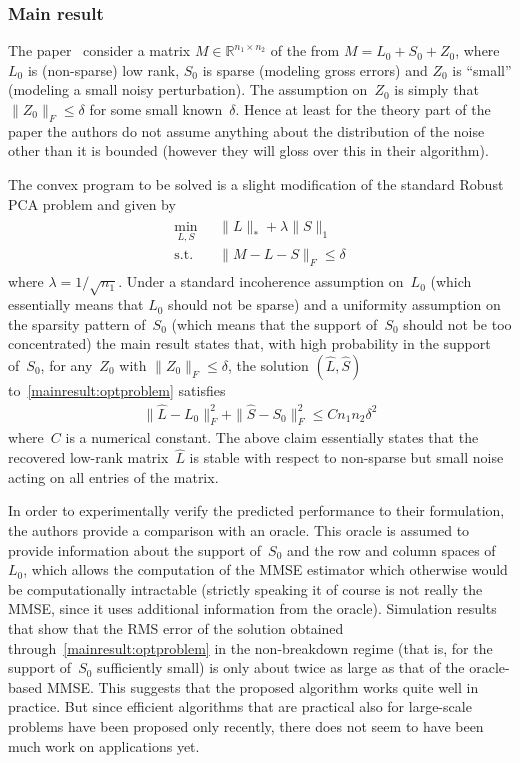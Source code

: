 \subsubsection{Main result}

The paper~\cite{Zhou:2010vn} consider a matrix $M\in\mathbb{R}^{n_1\times n_2}$ of the from $M = L_0+S_0+Z_0$, where~$L_0$ is (non-sparse) low rank, $S_0$ is sparse (modeling gross errors) and $Z_0$ is ``small'' (modeling a small noisy perturbation). The assumption on~$Z_0$ is simply that $\|Z_0\|_F \leq \delta$ for some small known~$\delta$. Hence at least for the theory part of the paper the authors do not assume anything about the distribution of the noise other than it is bounded (however they will gloss over this in their algorithm).

The convex program to be solved is a slight modification of the standard Robust PCA problem and given by
\begin{align}
\begin{split}
\min_{L,S} \; &\|L\|_* + \lambda \|S\|_1 \\
\text{s.t.} \quad &\|M-L-S\|_F \leq \delta
\end{split}
\label{mainresult:optproblem}
\end{align}
where $\lambda = 1/\sqrt{n_1}$. Under a standard incoherence assumption on~$L_0$ (which essentially means that $L_0$ should not be sparse) and a uniformity assumption on the sparsity pattern of~$S_0$ (which means that the support of~$S_0$ should not be too concentrated) the main result states that, with high probability in the support of~$S_0$, for any~$Z_0$ with $\|Z_0\|_F \leq \delta$, the solution $(\hat{L},\hat{S})$ to~\eqref{mainresult:optproblem} satisfies
\begin{align*}
\|\hat{L}-L_0\|_F^2 + \|\hat{S}-S_0\|_F^2 \leq C n_1n_2\delta^2
\end{align*}
where~$C$ is a numerical constant. The above claim essentially states that the recovered low-rank matrix~$\hat{L}$ is stable with respect to non-sparse but small noise acting on all entries of the matrix.

In order to experimentally verify the predicted performance to their formulation, the authors provide a comparison with an oracle. This oracle is assumed to provide information about the support of~$S_0$ and the row and column spaces of~$L_0$, which allows the computation of the MMSE estimator which otherwise would be computationally intractable (strictly speaking it of course is not really the MMSE, since it uses additional information from the oracle). Simulation results that show that the RMS error of the solution obtained through~\eqref{mainresult:optproblem} in the non-breakdown regime (that is, for the support of~$S_0$ sufficiently small) is only about twice as large as that of the oracle-based MMSE. This suggests that the proposed algorithm works quite well in practice. But since efficient algorithms that are practical also for large-scale problems have been proposed only recently, there does not seem to have been much work on applications yet.



